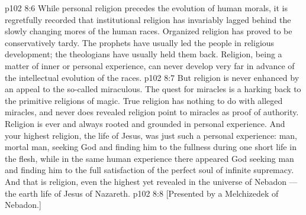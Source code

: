 \vs p102 8:6 While personal religion precedes the evolution of human morals, it is regretfully recorded that institutional religion has invariably lagged behind the slowly changing mores of the human races. Organized religion has proved to be conservatively tardy. The prophets have usually led the people in religious development; the theologians have usually held them back. Religion, being a matter of inner or personal experience, can never develop very far in advance of the intellectual evolution of the races.
\vs p102 8:7 But religion is never enhanced by an appeal to the so\hyp{}called miraculous. The quest for miracles is a harking back to the primitive religions of magic. True religion has nothing to do with alleged miracles, and never does revealed religion point to miracles as proof of authority. Religion is ever and always rooted and grounded in personal experience. And your highest religion, the life of Jesus, was just such a personal experience: man, mortal man, seeking God and finding him to the fullness during one short life in the flesh, while in the same human experience there appeared God seeking man and finding him to the full satisfaction of the perfect soul of infinite supremacy. And that is religion, even the highest yet revealed in the universe of Nebadon --- the earth life of Jesus of Nazareth.
\vsetoff
\vs p102 8:8 [Presented by a Melchizedek of Nebadon.]
